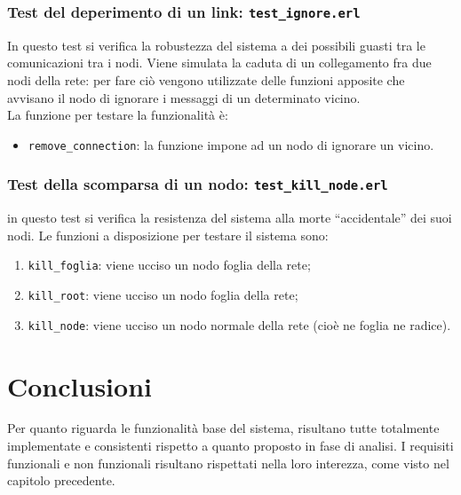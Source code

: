 \documentclass[italian]{memoir}
\begin{document}
\subsection{Test del deperimento di un link: \texttt{test\_ignore.erl}}
In questo test si verifica la robustezza del sistema a dei possibili guasti tra le comunicazioni tra i nodi. Viene simulata la caduta di un collegamento fra due nodi della rete: per fare ciò vengono utilizzate delle funzioni apposite che avvisano il nodo di ignorare i messaggi di un determinato vicino.\\
La funzione per testare la funzionalità è:
\begin{itemize}
    \item \texttt{remove\_connection}: la funzione impone ad un nodo di ignorare un vicino.
\end{itemize}


\subsection{Test della scomparsa di un nodo: \texttt{test\_kill\_node.erl}}
in questo test si verifica la resistenza del sistema alla morte ``accidentale'' dei suoi nodi. Le funzioni a disposizione per testare il sistema sono:
\begin{enumerate}
    \item \texttt{kill\_foglia}: viene ucciso un nodo foglia della rete;
    \item \texttt{kill\_root}: viene ucciso un nodo foglia della rete;
    \item \texttt{kill\_node}: viene ucciso un nodo normale della rete (cioè ne foglia ne radice).
\end{enumerate}


\chapter{Conclusioni}

Per quanto riguarda le funzionalità base del sistema, risultano tutte totalmente implementate e consistenti rispetto a quanto proposto in fase di analisi. I requisiti funzionali e non funzionali risultano rispettati nella loro interezza, come visto nel capitolo precedente.
\end{document}
